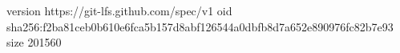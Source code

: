 version https://git-lfs.github.com/spec/v1
oid sha256:f2ba81ceb0b610e6fca5b157d8abf126544a0dbfb8d7a652e890976fc82b7e93
size 201560
